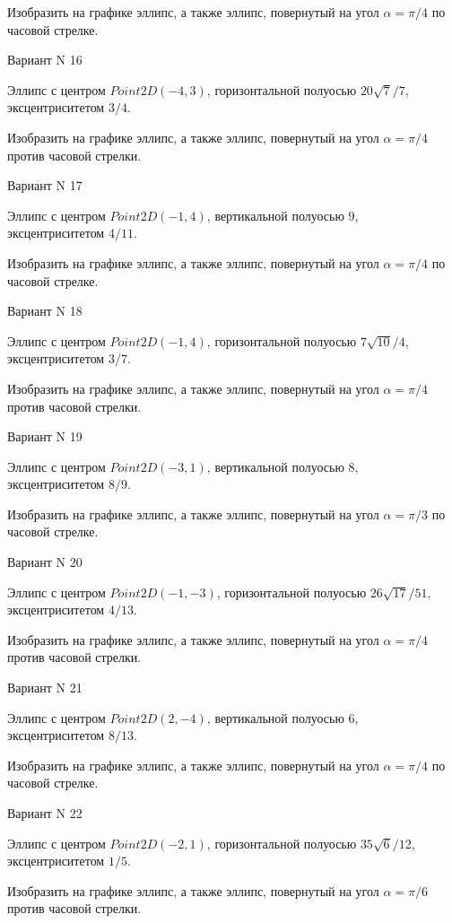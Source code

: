 \documentclass[11pt]{report}
\begin{document}
    Изобразить на графике эллипс, а также эллипс, повернутый на угол $\alpha = $$\pi / 4$ по часовой стрелке.

Вариант N 16

Эллипс с центром $Point2D\left(-4, 3\right)$, горизонтальной полуосью $20 \sqrt{7} / 7$, эксцентриситетом $3 / 4$.

    Изобразить на графике эллипс, а также эллипс, повернутый на угол $\alpha = $$\pi / 4$ против часовой стрелки.

Вариант N 17

Эллипс с центром $Point2D\left(-1, 4\right)$, вертикальной полуосью $9$, эксцентриситетом $4 / 11$.

    Изобразить на графике эллипс, а также эллипс, повернутый на угол $\alpha = $$\pi / 4$ по часовой стрелке.

Вариант N 18

Эллипс с центром $Point2D\left(-1, 4\right)$, горизонтальной полуосью $7 \sqrt{10} / 4$, эксцентриситетом $3 / 7$.

    Изобразить на графике эллипс, а также эллипс, повернутый на угол $\alpha = $$\pi / 4$ против часовой стрелки.

Вариант N 19

Эллипс с центром $Point2D\left(-3, 1\right)$, вертикальной полуосью $8$, эксцентриситетом $8 / 9$.

    Изобразить на графике эллипс, а также эллипс, повернутый на угол $\alpha = $$\pi / 3$ по часовой стрелке.

Вариант N 20

Эллипс с центром $Point2D\left(-1, -3\right)$, горизонтальной полуосью $26 \sqrt{17} / 51$, эксцентриситетом $4 / 13$.

    Изобразить на графике эллипс, а также эллипс, повернутый на угол $\alpha = $$\pi / 4$ против часовой стрелки.

Вариант N 21

Эллипс с центром $Point2D\left(2, -4\right)$, вертикальной полуосью $6$, эксцентриситетом $8 / 13$.

    Изобразить на графике эллипс, а также эллипс, повернутый на угол $\alpha = $$\pi / 4$ по часовой стрелке.

Вариант N 22

Эллипс с центром $Point2D\left(-2, 1\right)$, горизонтальной полуосью $35 \sqrt{6} / 12$, эксцентриситетом $1 / 5$.

    Изобразить на графике эллипс, а также эллипс, повернутый на угол $\alpha = $$\pi / 6$ против часовой стрелки.
\end{document}
